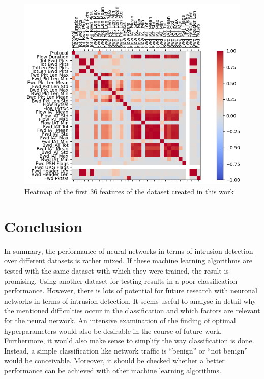 \documentclass[conference]{IEEEtran}
\begin{document}
\begin{figure}[htbp]  
\centerline{\includegraphics[scale=0.8]{Heatmap-NeueDaten-0-35.png}}
\caption{Heatmap of the first 36 features of the dataset created in this work}
\label{fig:hm2}
\end{figure}

\section{Conclusion}
In summary, the performance of neural networks in terms of intrusion detection over different datasets is rather mixed. If these machine learning algorithms are tested with the same dataset with which they were trained, the result is promising. Using another dataset for testing results in a poor classification performance. However, there is lots of potential for future research with neuronal networks in terms of intrusion detection. It seems useful to analyse in detail why the mentioned difficulties occur in the classification and which factors are relevant for the neural network. An intensive examination of the finding of optimal hyperparameters would also be desirable in the course of future work. Furthermore, it would also make sense to simplify the way classification is done. Instead, a simple classification like network traffic is “benign” or “not benign” would be conceivable. Moreover, it should be checked whether a better performance can be achieved with other machine learning algorithms.
\end{document}
